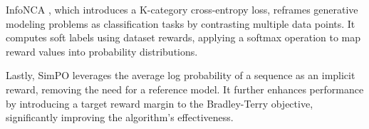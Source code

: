 InfoNCA \cite{chen2024noise}, which introduces a K-category cross-entropy loss, reframes generative modeling problems as classification tasks by contrasting multiple data points. It computes soft labels using dataset rewards, applying a softmax operation to map reward values into probability distributions.

Lastly, SimPO \cite{meng2024simpo} leverages the average log probability of a sequence as an implicit reward, removing the need for a reference model. It further enhances performance by introducing a target reward margin to the Bradley-Terry objective, significantly improving the algorithm's effectiveness.


